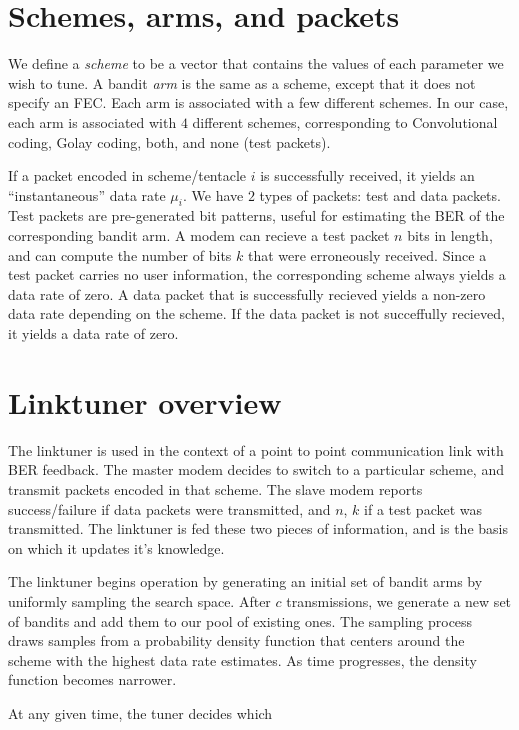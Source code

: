 \documentclass[12pt,a4paper]{article}
\begin{document}
\section{Schemes, arms, and packets}
We define a \emph{scheme} to be a vector that contains the values of each
parameter we wish to tune. A bandit \emph{arm} is the same as a scheme, except
that it does not specify an FEC. Each arm is associated with a few
different schemes. In our case, each arm is associated with $4$ different
schemes, corresponding to Convolutional coding, Golay coding, both, and none
(test packets).

If a packet encoded in scheme/tentacle $i$ is successfully received, it yields
an ``instantaneous'' data rate $\mu_i$. We have $2$ types of packets: test and
data packets. Test packets are pre-generated bit patterns, useful for estimating
the BER of the corresponding bandit arm. A modem can recieve a test packet $n$
bits in length, and can compute the number of bits $k$ that were erroneously received. 
Since a test packet carries no user information, the corresponding scheme always yields
a data rate of zero. A data packet that is successfully recieved yields a
non-zero data rate depending on the scheme. If the data packet is not
succeffully recieved, it yields a data rate of zero.


\section{Linktuner overview}
The linktuner is used in the context of a point to point communication link
with BER feedback. The master modem decides to switch to a particular scheme,
and transmit packets encoded in that scheme. The slave modem reports
success/failure if data packets were transmitted, and $n$, $k$ if a test packet
was transmitted. The linktuner is fed these two pieces of information, and is
the basis on which it updates it's knowledge.  

The linktuner begins operation by generating an initial set of bandit arms by
uniformly sampling the search space. After $c$ transmissions, we
generate a new set of bandits and add them to our pool of existing ones. The sampling
process draws samples from a probability density function that centers around
the scheme with the highest data rate estimates. As time progresses, the density function
becomes narrower. 

At any given time, the tuner decides which 
\end{document}
